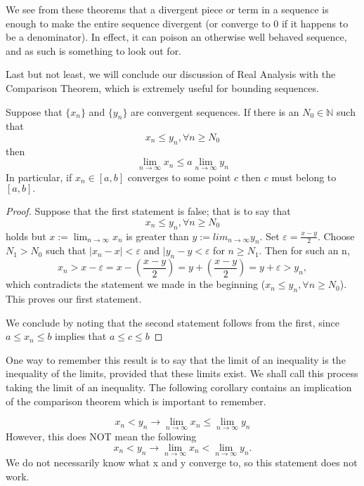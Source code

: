 We see from these theorems that a divergent piece or term in a sequence is enough to make the entire sequence divergent (or converge to 0 if it happens to be a denominator). In effect, it can poison an otherwise well behaved sequence, and as such is something to look out for. \newline

Last but not least, we will conclude our discussion of Real Analysis with the Comparison Theorem, which is extremely useful for bounding sequences.

\begin{theorem}
Suppose that $\{x_n\}$ and $\{y_n\}$ are convergent sequences. If there is an $N_0 \in \mathbb{N}$ such that $$x_n \leq y_n, \forall n \geq N_0$$ then $$\lim_{n \to \infty} x_n \leq a\lim_{n \to \infty} y_n$$ In particular, if $x_n \in [a,b]$ converges to some point $c$ then $c$ must belong to $[a,b].$
\end{theorem}

\begin{proof}
Suppose that the first statement is false; that is to say that $$x_n \leq y_n, \forall n \geq N_0$$ holds but $x:=\lim_{n \to \infty} x_n$ is greater than $y:=lim_{n \to \infty} y_n.$ Set $\varepsilon = \frac{x-y}{2}.$ Choose $N_1 > N_0$ such that $|x_n - x| < \varepsilon$ and $|y_n -y < \varepsilon$ for $n \geq N_1$. Then for such an n, $$x_n > x - \varepsilon = x - (\frac{x-y}{2}) = y + (\frac{x-y}{2}) = y + \varepsilon > y_n, $$ which contradicts the statement we made in the beginning ($x_n \leq y_n, \forall n \geq N_0$). This proves our first statement. \newline

We conclude by noting that the second statement follows from the first, since $ a \leq x_n \leq b$ implies that $a \leq c \leq b$
\end{proof}

One way to remember this result is to say that the limit of an inequality is the inequality of the limits, provided that these limits exist. We shall call this process taking the limit of an inequality. The following corollary contains an implication of the comparison theorem which is important to remember.

\begin{corollary}
$$x_n < y_n \rightarrow \lim_{n \to \infty}x_n \leq \lim_{n \to \infty}y_n$$
However, this does NOT mean the following
$$x_n < y_n \rightarrow \lim_{n \to \infty}x_n < \lim_{n \to \infty}y_n.$$
We do not necessarily know what x and y converge to, so this statement does not work.
\end{corollary}
